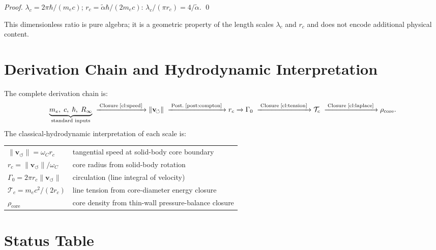 \documentclass[aps,pra,preprint,longbibliography,nofootinbib]{revtex4-2}
\newcommand{\vnorm}{\lVert\mathbf{v}_{\!\boldsymbol{\circlearrowleft}}\rVert} %
\newcommand{\rhocore}{\rho_{\mathrm{core}}}      %
\newcommand{\rc}{r_c}                            %
\newcommand{\omC}{\omega_C}                      %
\newcommand{\lc}{\lambda_c}                      %
\newcommand{\Tc}{\mathcal{T}_c}                  %
\newcommand{\Gz}{\Gamma_0}                       %
\begin{document}
\begin{proof}
$\lc = 2\pi\hbar/(m_ec)$; $\rc = \tilde\alpha\hbar/(2m_ec)$:
$\lc/(\pi\rc) = 4/\tilde\alpha$. \qed
\end{proof}

This dimensionless ratio is pure algebra; it is a geometric property
of the length scales $\lc$ and $\rc$ and does not encode additional
physical content.

\section{Derivation Chain and Hydrodynamic Interpretation}
\label{sec:chain}

The complete derivation chain is:
\begin{equation}
  \underbrace{m_e,\;c,\;\hbar,\;R_\infty}_{\text{standard inputs}}
  \;\xrightarrow{\;\text{Closure\;\ref{cl:speed}}\;}
  \vnorm
  \;\xrightarrow{\;\text{Post.\;\ref{post:compton}}\;}
  \rc
  \xrightarrow{}
  \Gz
  \;\xrightarrow{\;\text{Closure\;\ref{cl:tension}}\;}
  \Tc
  \;\xrightarrow{\;\text{Closure\;\ref{cl:laplace}}\;}
  \rhocore.
  \label{eq:chain}
\end{equation}
The classical-hydrodynamic interpretation of each scale is:

\medskip
\begin{tabular}{@{}ll@{}}
$\vnorm = \omC\rc$ & tangential speed at solid-body core boundary \\
$\rc = \vnorm/\omC$ & core radius from solid-body rotation \\
$\Gz = 2\pi\rc\vnorm$ & circulation (line integral of velocity) \\
$\Tc = m_e c^2/(2\rc)$ & line tension from core-diameter energy closure \\
$\rhocore$ & core density from thin-wall pressure-balance closure \\
\end{tabular}

\section{Status Table}
\label{sec:status}
\end{document}
